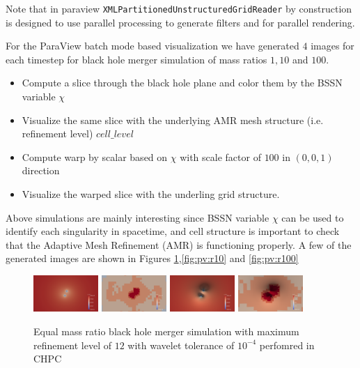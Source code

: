 Note that in paraview \texttt{XMLPartitionedUnstructuredGridReader} by construction is designed to use parallel processing to generate filters and for parallel rendering. 


For the ParaView batch mode based visualization we have generated $4$ images for each timestep for black hole merger simulation of mass ratios $1,10$ and $100$. 
\begin{itemize}
    \item Compute a slice through the black hole plane and color them by the BSSN variable $\chi$
    \item Visualize the same slice with the underlying AMR mesh structure (i.e. refinement level) $cell\_level$    
    \item Compute warp by scalar based on $\chi$ with scale factor of $100$ in $(0,0,1)$ direction
    \item Visualize the warped slice with the underling grid structure. 
\end{itemize}

Above simulations are mainly interesting since BSSN variable $\chi$ can be used to identify each singularity in spacetime, and cell structure is important to check that the Adaptive Mesh Refinement (AMR) is functioning properly. A few of the generated
images are shown in Figures \ref{fig:pv:r1},\ref{fig:pv:r10} and \ref{fig:pv:r100} 

\begin{figure}[H]
    \centering
    \includegraphics[width=0.22\textwidth]{figs/paraview/r1/img_slice_000200.png}
    \includegraphics[width=0.22\textwidth]{figs/paraview/r1/img_slice_level_000200.png}
    \includegraphics[width=0.22\textwidth]{figs/paraview/r1/img_slice_wbs_000200.png}
    \includegraphics[width=0.22\textwidth]{figs/paraview/r1/img_slice_level_wbs_000200.png}
    \caption{Equal mass ratio black hole merger simulation with maximum refinement level of $12$ with wavelet tolerance of $10^{-4}$ perfomred in CHPC \label{fig:pv:r1}}
\end{figure}


